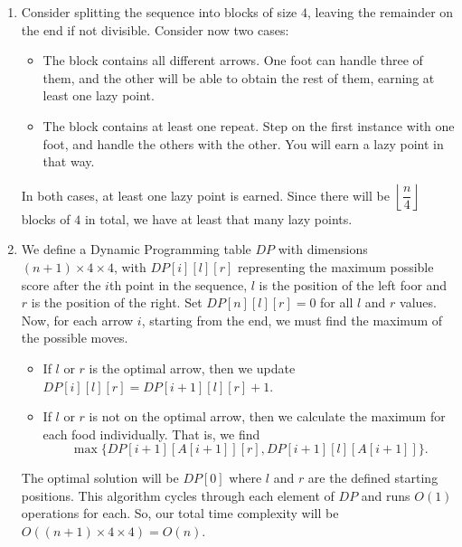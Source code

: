 \documentclass{article}
\begin{document}
\begin{solution}
\begin{enumerate}[label = (\alph*)]
    \item Consider splitting the sequence into blocks of size $4$, leaving the remainder on the end if not divisible. Consider now two cases:
\begin{itemize}
	\item The block contains all different arrows. One foot can handle three of them, and the other will be able to obtain the rest of them, earning at least one lazy point.
	\item The block contains at least one repeat. Step on the first instance with one foot, and handle the others with the other. You will earn a lazy point in that way.
\end{itemize}

In both cases, at least one lazy point is earned. Since there will be $\left \lfloor \dfrac{n}{4} \right \rfloor$ blocks of $4$ in total, we have at least that many lazy points.

    \item We define a Dynamic Programming table $DP$ with dimensions $(n+1) \times 4 \times 4$, with $DP[i][l][r]$ representing the maximum possible score after the $i$th point in the sequence, $l$ is the position of the left foor and $r$ is the position of the right. Set $DP[n][l][r] = 0$ for all $l$ and $r$ values. Now, for each arrow $i$, starting from the end, we must find the maximum of the possible moves.

\begin{itemize}
\item If $l$ or $r$ is the optimal arrow, then we update $DP[i][l][r] = DP[i+1][l][r] + 1$.
\item If $l$ or $r$ is not on the optimal arrow, then we calculate the maximum for each food individually. That is, we find $$\max \{DP[i+1][A[i+1]][r],DP[i+1][l][A[i+1]]\}.$$
\end{itemize}

The optimal solution will be $DP[0]$ where $l$ and $r$ are the defined starting positions. This algorithm cycles through each element of $DP$ and runs $O(1)$ operations for each. So, our total time complexity will be $O((n+1) \times 4 \times 4) = O(n)$.
\end{enumerate}
\end{solution}
\end{document}
